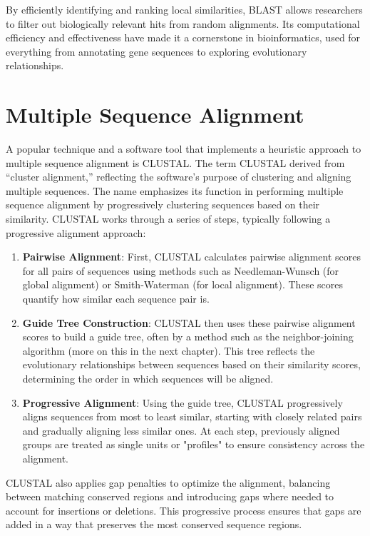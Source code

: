 By efficiently identifying and ranking local similarities, BLAST allows researchers to filter out biologically relevant hits from random alignments. Its computational efficiency and effectiveness have made it a cornerstone in bioinformatics, used for everything from annotating gene sequences to exploring evolutionary relationships.


\section{Multiple Sequence Alignment}

A popular technique and a software tool that implements a heuristic approach to multiple sequence alignment is CLUSTAL. 
The term CLUSTAL derived from ``cluster alignment,'' reflecting the software's purpose of clustering and aligning multiple sequences. The name emphasizes its function in performing multiple sequence alignment by progressively clustering sequences based on their similarity. CLUSTAL works through a series of steps, typically following a progressive alignment approach:

\begin{enumerate}
\item \textbf{Pairwise Alignment}: First, CLUSTAL calculates pairwise alignment scores for all pairs of sequences using methods such as Needleman-Wunsch (for global alignment) or Smith-Waterman (for local alignment). These scores quantify how similar each sequence pair is.
\item \textbf{Guide Tree Construction}: CLUSTAL then uses these pairwise alignment scores to build a guide tree, often by a method such as the neighbor-joining algorithm (more on this in the next chapter). This tree reflects the evolutionary relationships between sequences based on their similarity scores, determining the order in which sequences will be aligned.
\item \textbf{Progressive Alignment}: Using the guide tree, CLUSTAL progressively aligns sequences from most to least similar, starting with closely related pairs and gradually aligning less similar ones. At each step, previously aligned groups are treated as single units or "profiles" to ensure consistency across the alignment.
\end{enumerate}

CLUSTAL also applies gap penalties to optimize the alignment, balancing between matching conserved regions and introducing gaps where needed to account for insertions or deletions. This progressive process ensures that gaps are added in a way that preserves the most conserved sequence regions.